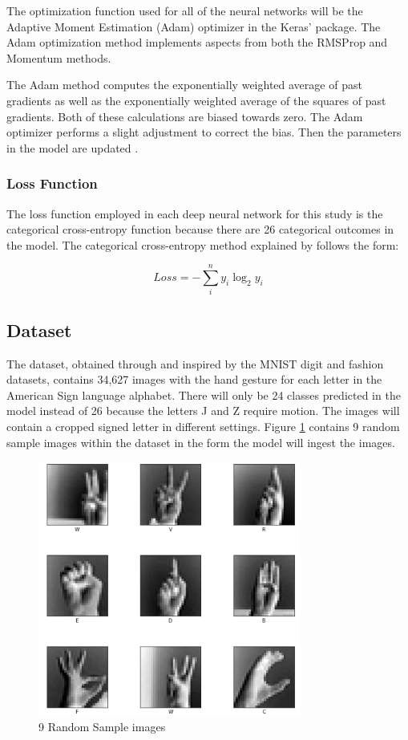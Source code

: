 \documentclass[5p,authoryear]{elsarticle}
\begin{document}
The optimization function used for all of the neural networks will be the Adaptive Moment Estimation (Adam) optimizer in the Keras’ package. The Adam optimization method implements aspects from both the RMSProp and Momentum methods.  

The Adam method computes the exponentially weighted average of past gradients as well as the exponentially weighted average of the squares of past gradients. Both of these calculations are biased towards zero. The Adam optimizer performs a slight adjustment to correct the bias. Then the parameters in the model are updated \citep{adam}. 



\subsubsection{Loss Function}

The loss function employed in each deep neural network for this study is the categorical cross-entropy function because there are 26 categorical outcomes in the model. The categorical cross-entropy method explained by \cite{mool} follows the form:

$$Loss = -\sum_{i}^n y_i \log_2 y_i$$

\subsection{Dataset}

The dataset, obtained through \cite{kaggle} and inspired by the MNIST digit and fashion datasets, contains 34,627 images with the hand gesture for each letter in the American Sign language alphabet. There will only be 24 classes predicted in the model instead of 26 because the letters J and Z require motion. The images will contain a cropped signed letter in different settings. Figure \ref{Random Samples} contains 9 random sample images within the dataset in the form the model will ingest the images.


\begin{figure}[!htb] \centering
	\includegraphics[width=3.4in]{figures/9-random-samples.png}
	\caption[]{9 Random Sample images} 
	\label{Random Samples} 
\end{figure}
\end{document}
